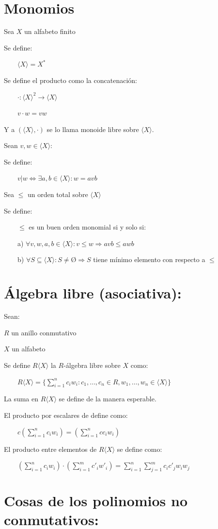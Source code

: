 \documentclass{amsbook}
\begin{document}
\fontsize{16pt}{19pt}\selectfont %

\section{Monomios}

Sea $X$ un alfabeto finito

Se define:

    $⟨X⟩ = X^*$

Se define el producto como la concatenación:

    $· : ⟨X⟩^2 → ⟨X⟩$

    $v · w = vw$

Y a $(⟨X⟩, ·)$ se lo llama monoide libre sobre $⟨X⟩$.

Sean $v, w ∈ ⟨X⟩$:

Se define:

    $v | w ⇔ ∃a , b ∈ ⟨X⟩ : w = avb$

Sea $≤$ un orden total sobre $⟨X⟩$

Se define:

    $≤$ es un buen orden monomial si y solo si:

    a) $∀v, w, a, b ∈ ⟨X⟩ : v ≤ w ⇒ avb ≤ awb$

    b) $∀S ⊆ ⟨X⟩ : S ≠ Ø ⇒ S$ tiene mínimo elemento con respecto a $≤$

\section{Álgebra libre (asociativa):}

Sean:

$R$ un anillo conmutativo

$X$ un alfabeto

Se define $R⟨X⟩$ la $R$-álgebra libre sobre $X$ como:

    $R⟨X⟩ = \{\sum_{i = 1}^n c_i w_i : c_1, …, c_n ∈ R, w_1, …, w_n ∈ ⟨X⟩\}$

La suma en $R⟨X⟩$ se define de la manera esperable.

El producto por escalares de define como:

    $c (\sum_{i = 1}^n c_i w_i) = (\sum_{i = 1}^n c c_i w_i)$

El producto entre elementos de $R⟨X⟩$ se define como:

    $(\sum_{i = 1}^n c_i w_i) · (\sum_{i = 1}^m c'_i w'_i) = \sum_{i = 1}^n \sum_{j = 1}^m c_i c'_j w_i w_j$

\section{Cosas de los polinomios no conmutativos:}
\end{document}
